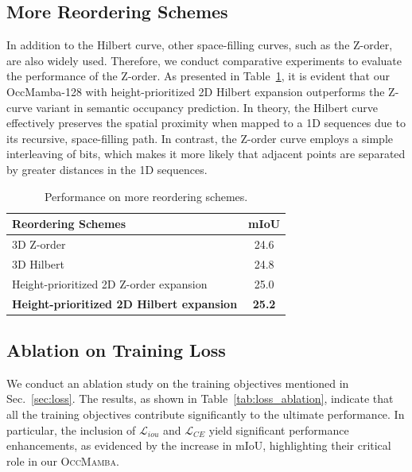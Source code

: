 \documentclass[10pt,twocolumn,letterpaper]{article}
\newcommand{\methodname}{\textsc{OccMamba}}
\begin{document}
\subsection{More Reordering Schemes}

In addition to the Hilbert curve, other space-filling curves, such as the Z-order, are also widely used. Therefore, we conduct comparative experiments to evaluate the performance of the Z-order. As presented in Table~\ref{tab:reorder_full}, it is evident that our OccMamba-128 with height-prioritized 2D Hilbert expansion outperforms the Z-curve variant in semantic occupancy prediction. In theory, the Hilbert curve effectively preserves the spatial proximity when mapped to a 1D sequences due to its recursive, space-filling path. In contrast, the Z-order curve employs a simple interleaving of bits, which makes it more likely that adjacent points are separated by greater distances in the 1D sequences.

\begin{table}[htbp]
\centering
\caption{Performance on more reordering schemes.}
\label{tab:reorder_full}
\begin{tabular}{lc}
\toprule
Reordering Schemes & mIoU \\
\midrule
3D Z-order & 24.6 \\
3D Hilbert & 24.8 \\
Height-prioritized 2D Z-order expansion & 25.0 \\
\textbf{Height-prioritized 2D Hilbert expansion} & \textbf{25.2} \\
\bottomrule
\end{tabular}
\end{table}

\subsection{Ablation on Training Loss}

We conduct an ablation study on the training objectives mentioned in Sec.~\ref{sec:loss}. The results, as shown in Table~\ref{tab:loss_ablation}, indicate that all the training objectives contribute significantly to the ultimate performance. In particular, the inclusion of $\mathcal{L}_{iou}$ and $\mathcal{L}_{CE}$ yield significant performance enhancements, as evidenced by the increase in mIoU, highlighting their critical role in our \methodname{}.
\end{document}

